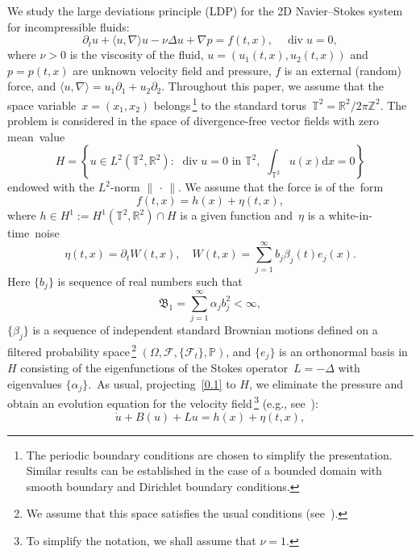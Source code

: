 \documentclass[10pt]{amsart}
\theoremstyle{definition}\newtheorem{defi}[theo]{Definition}\newtheorem{rema}[theo]{Remark}\newtheorem{exam}[theo]{Example}\newtheorem{exem}[theo]{Example}\newtheorem{nota}[theo]{Notation}
\DeclareMathOperator{\diver}{div}
\newcommand{\p}{\partial}
\newcommand{\R}{{\mathbb R}}
\newcommand{\Z}{{\mathbb Z}}
\newcommand{\pP}{{\mathbb P}}
\newcommand{\T}{{\mathbb T}}
\newcommand{\FF}{{\mathcal F}}
\newcommand{\ty}{\infty}
\newcommand{\BBBB}{{\mathfrak B}}
\newcommand{\lag}{\langle}
\newcommand{\rag}{\rangle}
\newcommand{\dd}{\mathrm{d}}
\begin{document}
We study the large deviations principle (LDP) for the 2D Navier--Stokes system for incompressible fluids:
\begin{equation}\label{0.1}
\p_t u+\langle u,\nabla \rangle u-\nu\Delta u+\nabla p=f(t,x), \quad\diver u=0,
\end{equation}
where $\nu>0$ is the viscosity of the fluid, $u = (u_1(t,x), u_2(t,x))$ and~$p = p(t, x)$ are unknown velocity field and pressure, $f$ is an external (random) force, and $\lag u, \nabla \rag=u_1\partial_1+u_2\partial_2$. Throughout this paper, we assume that the space variable~$x = (x_1, x_2)$ belongs\,\footnote{The periodic boundary conditions are chosen to simplify the presentation. Similar results can be established in the case of a bounded domain with smooth boundary and Dirichlet boundary conditions.} to the standard torus~$\T^2=\R^2/2\pi\Z^2$. The problem is considered in the space of divergence-free vector fields with zero mean~value
\begin{equation}\label{space1}
H= \left\{u\in L^2(\T^2,\R^2):\,\, \diver u=0 \,\, \text{in $\T^2$,} \,\,\,\int_{\T^2} u(x) \dd x=0 \right\}
\end{equation}
endowed with the $L^2$-norm $\|{\,\cdot\,}\|$. We assume that the force is of the~form
\[
f(t,x)=h(x)+ \eta(t,x),
\]
where $ h\in H^1:= H^1(\T^2, \R^2)\cap H$ is a given function and~$\eta$ is a white-in-time~noise
\begin{equation}\label{0.2}
\eta(t,x)= \p_t W(t,x),\quad W(t,x)=\sum_{j=1}^\ty b_j\beta_j(t) e_j(x).
\end{equation}
Here $\{b_j\}$ is sequence of real numbers such that
\begin{equation}
{\BBBB_{1}}=\sum_{j=1}^\ty \alpha_j b_j^2<\ty, \label{0.3}
\end{equation}
$\{\beta_j\} $ is a sequence of independent standard Brownian motions defined on a filtered probability space\,\footnote{We assume that this space satisfies the usual conditions (see~\cite[Definition~2.25]{KS1991}).} $(\Omega,\FF, \{\FF_t\}, \pP)$, and $\{e_j\}$ is an orthonormal basis in $H$ consisting of the eigenfunctions of the Stokes operator~$L=- \Delta $ with eigenvalues $\{\alpha_j\}$.~As usual, projecting~\eqref{0.1} to $H$, we eliminate the pressure and obtain an evolution equation for the velocity field\,\footnote{To simplify the notation, we shall assume that $\nu = 1$.} (e.g., see~\cite[Chapter~1, Section~6]{lions1969}):
\begin{equation}\label{0.4}
\dot u+B(u)+L u =h(x)+ \eta(t,x),
\end{equation}
\end{document}
